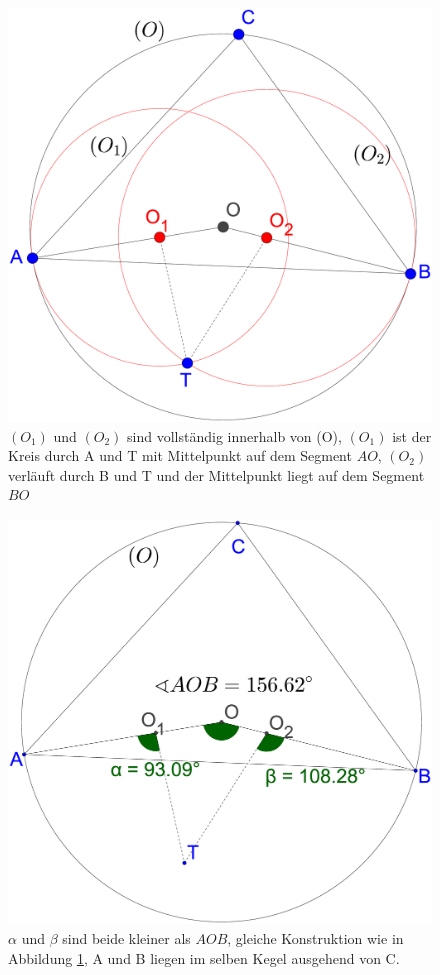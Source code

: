 \documentclass[a4paper,twoside]{IEEEtran}
\begin{document}
\begin{figure}[h!]
\centering
\includegraphics[width=0.8\linewidth]{outward_path_kreise.eps}
\caption{ $(O_1) $ und $(O_2) $ sind vollständig innerhalb von (O), $(O_1) $ ist der Kreis durch A und T mit Mittelpunkt auf dem Segment $AO $, $(O_2) $ verläuft durch B und T und der Mittelpunkt liegt auf dem Segment $BO $} 
\label{fig:outward_path_kreise}
\end{figure}

\begin{figure}[h!]
\centering
\includegraphics[width=0.8\linewidth]{outward_path_winkel.eps}
\caption{ $\alpha $ und $\beta $ sind beide kleiner als $ AOB $, gleiche Konstruktion wie in Abbildung \ref{fig:outward_path_kreise}, A und B liegen im selben Kegel ausgehend von C.}
\label{fig:outward_path_winkel}
\end{figure}
\end{document}
